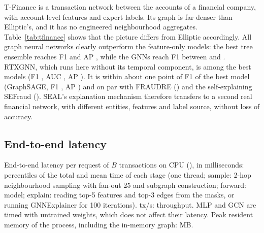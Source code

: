 T-Finance is a transaction network between the accounts of a financial company, with account-level features and expert labels. Its graph is far denser than Elliptic's, and it has no engineered neighbourhood aggregates. Table~\ref{tab:tfinance} shows that the picture differs from Elliptic accordingly. All graph neural networks clearly outperform the feature-only models: the best tree ensemble reaches F1 \tfxgbFone{} and AP \tfxgbAP, while the GNNs reach F1 between \tfgcnFone{} and \tfsageFone{}. RTXGNN, which runs here without its temporal component, is among the best models (F1 \tfrtxgnnFone, AUC \tfrtxgnnAUC, AP \tfrtxgnnAP). It is within about one point of F1 of the best model (GraphSAGE, F1 \tfsageFone, AP \tfsageAP) and on par with FRAUDRE (\tffraudreFone) and the self-explaining SEFraud (\tfsefraudFone). SEAL's explanation mechanism therefore transfers to a second real financial network, with different entities, features and label source, without loss of accuracy.

\subsection{End-to-end latency}
\label{subsec:latency}

\begin{table}[!t]
\centering
\caption{End-to-end latency per request of $B$ transactions on CPU (\cpuName), in milliseconds: percentiles of the total and mean time of each stage (one thread; sample: 2-hop neighbourhood sampling with fan-out 25 and subgraph construction; forward: model; explain: reading top-5 features and top-3 edges from the masks, or running GNNExplainer for 100 iterations). tx/s: throughput. MLP and GCN are timed with untrained weights, which does not affect their latency. Peak resident memory of the process, including the in-memory graph: \peakRss{} MB.}
\label{tab:latency}
\footnotesize
\setlength{\tabcolsep}{3pt}
\begin{adjustbox}{max width=\textwidth}\end{adjustbox}
\end{table}

